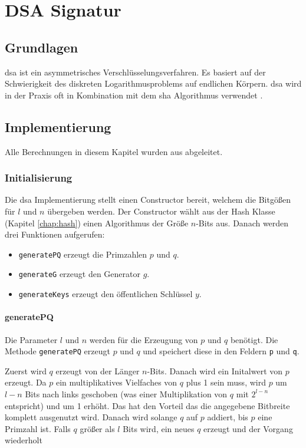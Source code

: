 \chapter{DSA Signatur}

\section{Grundlagen}
\gls{dsa} ist ein asymmetrisches Verschlüsselungsverfahren. Es basiert auf der Schwierigkeit des diskreten Logarithmusproblems auf endlichen Körpern. \gls{dsa} wird in der Praxis oft in Kombination mit dem \gls{sha} Algorithmus verwendet \cite{nist1991proposed}.

\section{Implementierung}

Alle Berechnungen in diesem Kapitel wurden aus \cite{enwiki:1194947270} abgeleitet.

\subsection{Initialisierung}
Die \gls{dsa} Implementierung stellt einen Constructor bereit, welchem die Bitgößen für $l$ und $n$ übergeben werden. Der Constructor wählt aus der Hash Klasse (Kapitel \ref{chap:hash}) einen Algorithmus der Größe $n$-Bits aus. Danach werden drei Funktionen aufgerufen:
\begin{itemize}
    \item \texttt{generatePQ} erzeugt die Primzahlen $p$ und $q$.
    \item \texttt{generateG} erzeugt den Generator $g$.
    \item \texttt{generateKeys} erzeugt den öffentlichen Schlüssel $y$.
\end{itemize}

\subsubsection{generatePQ}
Die Parameter $l$ und $n$ werden für die Erzeugung von $p$ und $q$ benötigt. Die Methode \texttt{generatePQ} erzeugt $p$ und $q$ und speichert diese in den Feldern \texttt{p} und \texttt{q}.

Zuerst wird $q$ erzeugt von der Länger $n$-Bits. Danach wird ein Initalwert von $p$ erzeugt. Da $p$ ein multiplikatives Vielfaches von $q$ plus 1 sein muss, wird $p$ um $l-n$ Bits nach links geschoben (was einer Multiplikation von $q$ mit $2^{l-n}$ entspricht) und um 1 erhöht. Das hat den Vorteil das die angegebene Bitbreite komplett ausgenutzt wird. Danach wird solange $q$ auf $p$ addiert, bis $p$ eine Primzahl ist.
Falls $q$ größer als $l$ Bits wird, ein neues $q$ erzeugt und der Vorgang wiederholt

